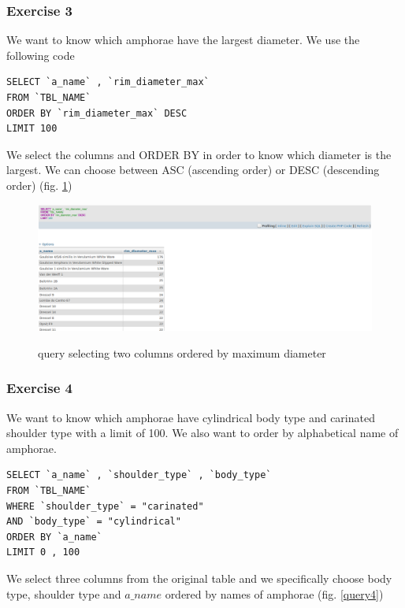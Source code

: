\documentclass[10pt,a4paper]{article}
\begin{document}
\subsubsection{Exercise 3}

We want to know which amphorae have the largest diameter. We use the following code

\begin{verbatim}
SELECT `a_name` , `rim_diameter_max`
FROM `TBL_NAME`
ORDER BY `rim_diameter_max` DESC
LIMIT 100 
\end{verbatim}

We select the columns and ORDER BY in order to know which diameter is the largest. We can choose between ASC (ascending order) or DESC (descending order) (fig. \ref{query3})

\begin{figure}[hdp]
\centering
\includegraphics[scale=0.30]{query3.png}
\label{query3}
\caption{query selecting two columns ordered by maximum diameter}
\end{figure} 

\subsubsection{Exercise 4}

We want to know which amphorae have cylindrical body type and carinated shoulder type with a limit of 100. We also want to order by alphabetical name of amphorae. 

\begin{verbatim}
SELECT `a_name` , `shoulder_type` , `body_type`
FROM `TBL_NAME`
WHERE `shoulder_type` = "carinated"
AND `body_type` = "cylindrical"
ORDER BY `a_name`
LIMIT 0 , 100
\end{verbatim}

We select three columns from the original table and we specifically choose body type, shoulder type and $a\_name$ ordered by names of amphorae (fig. \ref{query4})
\end{document}
